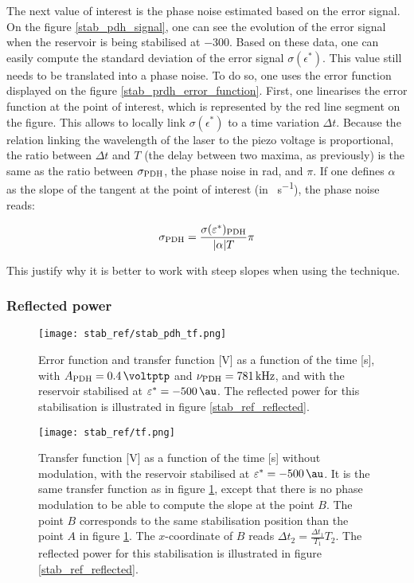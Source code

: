 The next value of interest is the phase noise estimated based on the error signal. On the figure \ref{stab_pdh_signal}, one can see the evolution of the \pdh error signal when the reservoir is being stabilised at \SI{-300}{\au}. Based on these data, one can easily compute the standard deviation of the error signal $\sigma(\epsilon^*)$. This value still needs to be translated into a phase noise. To do so, one uses the error function displayed on the figure \ref{stab_prdh_error_function}. First, one linearises the error function at the point of interest, which is represented by the red line segment on the figure. This allows to locally link $\sigma(\epsilon^*)$ to a time variation $\Delta t$. Because the relation linking the wavelength of the laser to the piezo voltage is proportional, the ratio between $\Delta t$ and $T$ (the delay between two maxima, as previously) is the same as the ratio between $\sigma_{\text{PDH}}$, the phase noise in \si{\radian}, and $\pi$. If one defines $\alpha$ as the slope of the tangent at the point of interest (in \si{\au\per\second}), the phase noise reads:

\begin{equation}
	\sigma_{\text{PDH}} = \frac{\sigma(\varepsilon^*)_{\text{PDH}} }{|\alpha| T} \pi
\end{equation}

This justify why it is better to work with steep slopes when using the \pdh technique.


\subsubsection{Reflected power}

\begin{figure}
	\centering
	\texttt{[image: stab\_ref/stab\_pdh\_tf.png]}
	\caption{Error function and transfer function [\si{\volt}] as a function of the time [\si{\second}], with $\tind{A}{PDH} = \SI{0.4}{\voltptp}$ and $\nu_{\text{PDH}} = \SI{781}{\kilo\hertz}$, and with the reservoir stabilised at $\epsilon^* = \SI{-500}{\au}$. The reflected power for this stabilisation is illustrated in figure \ref{stab_ref_reflected}.}
	\label{stab_ref_pdh_tf}
\end{figure}

\begin{figure}
	\centering
	\texttt{[image: stab\_ref/tf.png]}
	\caption{Transfer function [\si{\volt}] as a function of the time [\si{\second}] without \pdh modulation, with the reservoir stabilised at $\epsilon^* = \SI{-500}{\au}$. It is the same transfer function as in figure \ref{stab_ref_pdh_tf}, except that there is no phase modulation to be able to compute the slope at the point $B$. The point $B$ corresponds to the same stabilisation position than the point $A$ in figure \ref{stab_ref_pdh_tf}. The $x$-coordinate of $B$ reads $\Delta t_2 = \frac{\Delta t_1}{T_1}T_2$. The reflected power for this stabilisation is illustrated in figure \ref{stab_ref_reflected}.}
	\label{stab_ref_tf}
\end{figure}

